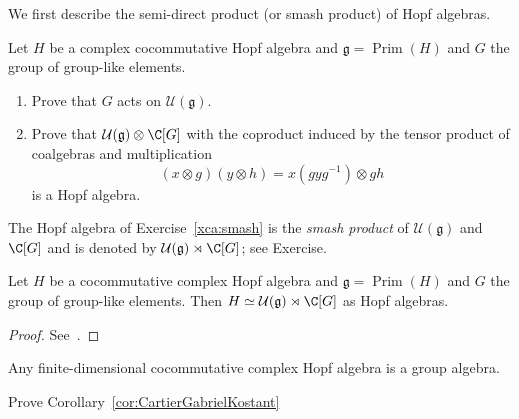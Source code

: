 We first describe 
the semi-direct product (or smash product) 
of Hopf algebras. 


\begin{exercise}
\label{xca:smash}
Let $H$ be a complex cocommutative Hopf algebra and 
$\mathfrak{g}=\operatorname{Prim}(H)$ and 
$G$ the group 
of group-like elements.  
\begin{enumerate}
    \item Prove that $G$ acts on $\mathcal{U}(\mathfrak{g})$.    
    \item Prove that $\mathcal{U}(\mathfrak{g})\otimes\C[G]$ 
    with the coproduct induced by the tensor product of 
    coalgebras and multiplication
    \[
    (x\otimes g)(y\otimes h)=x(gyg^{-1})\otimes gh
    \]
    is a Hopf algebra. 
\end{enumerate}
\end{exercise}

The Hopf algebra of Exercise~\ref{xca:smash} is 
the \emph{smash product} of 
$\mathcal{U}(\mathfrak{g})$ and $\C[G]$
and is denoted by $\mathcal{U}(\mathfrak{g})\rtimes\C[G]$; see Exercise.%

\begin{theorem}
    \label{thm:CartierGabrielKostant}
    Let $H$ be a cocommutative complex Hopf algebra 
    and $\mathfrak{g}=\operatorname{Prim}(H)$ and $G$ 
    the group of group-like elements. Then 
    $H\simeq\mathcal{U}(\mathfrak{g})\rtimes\C[G]$ as 
    Hopf algebras. 
\end{theorem}

\begin{proof}
    See~\cite[Theorem 4.5.1]{zbMATH07372929}. 
\end{proof}


\begin{corollary}
\label{cor:CartierGabrielKostant}
    Any finite-dimensional cocommutative complex Hopf algebra
    is a group algebra. 
\end{corollary}

\begin{exercise}
    Prove Corollary~\ref{cor:CartierGabrielKostant}
\end{exercise}

